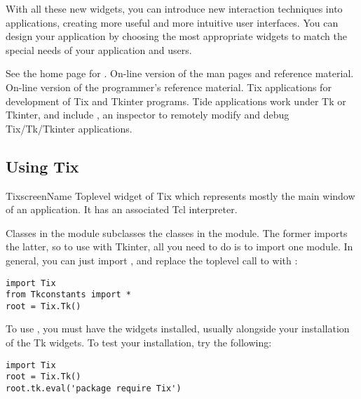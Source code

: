 With all these new widgets, you can introduce new interaction
techniques into applications, creating more useful and more intuitive
user interfaces. You can design your application by choosing the most
appropriate widgets to match the special needs of your application and
users. 

\begin{seealso}
        {See the home page for .}
        {On-line version of the man pages and reference material.}
        {On-line version of the programmer's reference material.}
        {Tix applications for development of Tix and Tkinter programs.
         Tide applications work under Tk or Tkinter, and include
         , an inspector to remotely modify and
         debug Tix/Tk/Tkinter applications.}
\end{seealso}


\subsection{Using Tix}

\begin{classdesc}{Tix}{screenName}
    Toplevel widget of Tix which represents mostly the main window
    of an application. It has an associated Tcl interpreter.

Classes in the  module subclasses the classes in the
 module. The former imports the latter, so to use
 with Tkinter, all you need to do is to import one
module. In general, you can just import , and replace
the toplevel call to  with :
\begin{verbatim}
import Tix
from Tkconstants import *
root = Tix.Tk()
\end{verbatim}
\end{classdesc}

To use , you must have the  widgets installed,
usually alongside your installation of the Tk widgets.
To test your installation, try the following:
\begin{verbatim}
import Tix
root = Tix.Tk()
root.tk.eval('package require Tix')
\end{verbatim}

